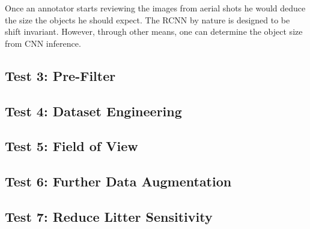 \documentclass{article}
\begin{document}
Once an annotator starts reviewing the images from aerial shots he would deduce the size the objects he should expect. The RCNN by nature is designed to be shift invariant. However, through other means, one can determine the object size from CNN inference.

\subsection{Test 3: Pre-Filter}

\subsection{Test 4: Dataset Engineering}

\subsection{Test 5: Field of View}

\subsection{Test 6: Further Data Augmentation}

\subsection{Test 7: Reduce Litter Sensitivity}
\end{document}
